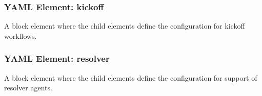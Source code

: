 \subsubsection{YAML Element: kickoff}\label{sec:yaml-moniker-kickoff}
A block element where the child elements define the configuration for kickoff workflows. 

\subsubsection{YAML Element: resolver}\label{sec:yaml-moniker-resolver}
A block element where the child elements define the configuration for support of resolver agents. 


